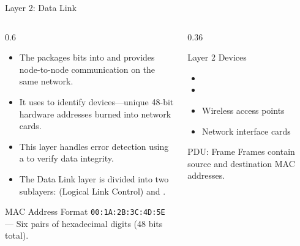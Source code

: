 \documentclass[aspectratio=169]{beamer}  %
\begin{document}
\begin{frame}{Layer 2: Data Link}
    \begin{columns}[T]
        \begin{column}{0.6\textwidth}
            \begin{itemize}
                \item The  packages bits into  and provides node-to-node communication on the same network.
                \item It uses  to identify devices---unique 48-bit hardware addresses burned into network cards.
                \item This layer handles error detection using a  to verify data integrity.
                \item The Data Link layer is divided into two sublayers:  (Logical Link Control) and .
            \end{itemize}
            
            \vspace{0.3em}
            \begin{exampleblock}{MAC Address Format}
                \texttt{00:1A:2B:3C:4D:5E} --- Six pairs of hexadecimal digits (48 bits total).
            \end{exampleblock}
        \end{column}
        \begin{column}{0.36\textwidth}
            \begin{block}{Layer 2 Devices}
                \begin{itemize}
                    \item {}
                    \item {}
                    \item Wireless access points
                    \item Network interface cards
                \end{itemize}
            \end{block}
            
            \vspace{0.3em}
            \begin{alertblock}{PDU: Frame}
                Frames contain source and destination MAC addresses.
            \end{alertblock}
        \end{column}
    \end{columns}
\end{frame}
\end{document}
